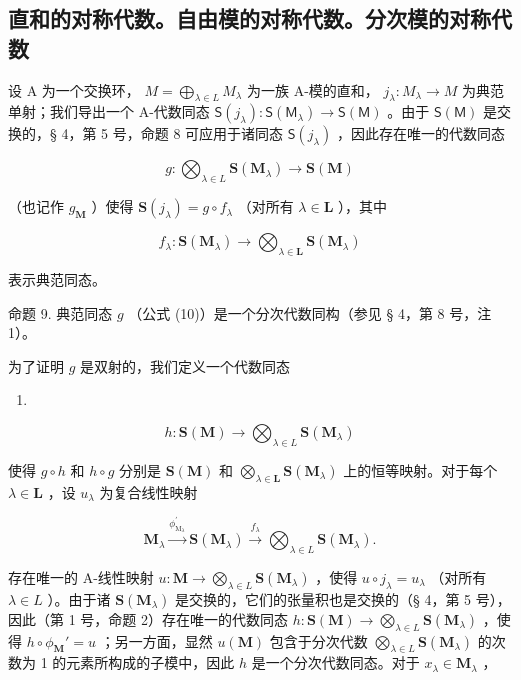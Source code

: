 \subsection{直和的对称代数。自由模的对称代数。分次模的对称代数}

设 A 为一个交换环， \(M = \bigoplus_{\lambda \in L} M_{\lambda}\) 为一族 A-模的直和， \(j_{\lambda}: M_{\lambda} \to M\) 为典范单射；我们导出一个 A-代数同态 \(\mathsf{S}(j_{\lambda}): \mathsf{S}(\mathsf{M}_{\lambda}) \to \mathsf{S}(\mathsf{M})\) 。由于 \(\mathsf{S}(\mathsf{M})\) 是交换的，§ 4，第 5 号，命题 8 可应用于诸同态 \(\mathsf{S}(j_{\lambda})\) ，因此存在唯一的代数同态

\[
g \colon \bigotimes_ {\lambda \in L} \mathbf {S} (\mathbf {M} _ {\lambda}) \rightarrow \mathbf {S} (\mathbf {M})\tag{10}
\]

（也记作 \(g_{\mathbf{M}}\) ）使得 \(\mathbf{S}(j_{\lambda}) = g \circ f_{\lambda}\) （对所有 \(\lambda \in \mathbf{L}\) ），其中

\[
f _ {\lambda} \colon \mathbf {S} (\mathbf {M} _ {\lambda}) \rightarrow \bigotimes_ {\lambda \in \mathbf {L}} \mathbf {S} (\mathbf {M} _ {\lambda})
\]

表示典范同态。

命题 9. 典范同态 \(g\) （公式 (10)）是一个分次代数同构（参见 § 4，第 8 号，注 1）。

为了证明 \(g\) 是双射的，我们定义一个代数同态

\begin{enumerate}
\def\labelenumi{(\arabic{enumi})}
\setcounter{enumi}{10}
\tightlist
\item
\end{enumerate}

\[
h \colon \mathbf {S} (\mathbf {M}) \rightarrow \bigotimes_ {\lambda \in L} \mathbf {S} (\mathbf {M} _ {\lambda})
\]

使得 \(g \circ h\) 和 \(h \circ g\) 分别是 \(\mathbf{S}(\mathbf{M})\) 和 \(\bigotimes_{\lambda \in \mathbf{L}} \mathbf{S}(\mathbf{M}_{\lambda})\) 上的恒等映射。对于每个 \(\lambda \in \mathbf{L}\) ，设 \(u_{\lambda}\) 为复合线性映射

\[
\mathbf {M} _ {\lambda} \xrightarrow {\phi_ {\mathrm{M} _ {\lambda}} ^ {\prime}} \mathbf {S} (\mathbf {M} _ {\lambda}) \xrightarrow {f _ {\lambda}} \bigotimes_ {\lambda \in L} \mathbf {S} (\mathbf {M} _ {\lambda}).
\]

存在唯一的 A-线性映射 \(u: \mathbf{M} \to \bigotimes_{\lambda \in L} \mathbf{S}(\mathbf{M}_{\lambda})\) ，使得 \(u \circ j_{\lambda} = u_{\lambda}\) （对所有 \(\lambda \in L\) ）。由于诸 \(\mathbf{S}(\mathbf{M}_{\lambda})\) 是交换的，它们的张量积也是交换的（§ 4，第 5 号），因此（第 1 号，命题 2）存在唯一的代数同态 \(h: \mathbf{S}(\mathbf{M}) \to \bigotimes_{\lambda \in L} \mathbf{S}(\mathbf{M}_{\lambda})\) ，使得 \(h \circ \phi_{\mathbf{M}}' = u\) ；另一方面，显然 \(u(\mathbf{M})\) 包含于分次代数 \(\bigotimes_{\lambda \in L} \mathbf{S}(\mathbf{M}_{\lambda})\) 的次数为 1 的元素所构成的子模中，因此 \(h\) 是一个分次代数同态。对于 \(x_{\lambda} \in \mathbf{M}_{\lambda}\) ，

